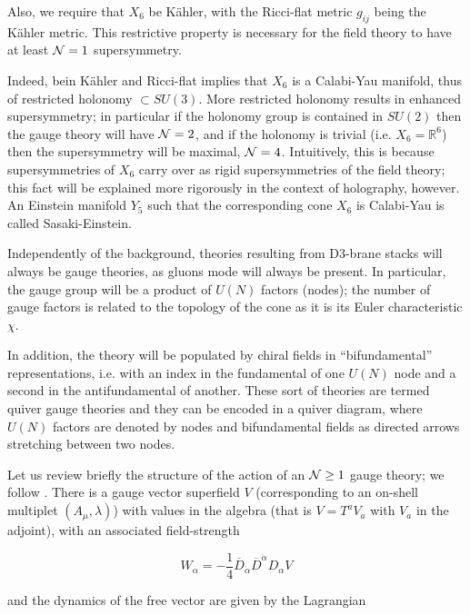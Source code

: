 Also, we require that $X_6$ be K\"ahler, with the Ricci-flat metric $g_{ij}$ being the K\"ahler metric. This restrictive property is necessary\cite{KW_SCFT} for the field theory to have at least $\mathcal{N} = 1$ supersymmetry.

Indeed, bein K\"ahler and Ricci-flat implies that $X_6$ is a Calabi-Yau manifold, thus of restricted holonomy $\subset SU(3)$. More restricted holonomy results in enhanced supersymmetry; in particular if the holonomy group is contained in $SU(2)$ then the gauge theory will have $\mathcal{N} = 2$, and if the holonomy is trivial (i.e. $X_6 = \mathbb{R}^6$) then the supersymmetry will be maximal, $\mathcal{N} = 4$. Intuitively, this is because supersymmetries of $X_6$ carry over as rigid supersymmetries of the field theory; this fact will be explained more rigorously in the context of holography, however. An Einstein manifold $Y_5$ such that the corresponding cone $X_6$ is Calabi-Yau is called Sasaki-Einstein.

Independently of the background, theories resulting from D3-brane stacks will always be gauge theories, as gluons mode will always be present. In particular, the gauge group will be a product of $U(N)$ factors (nodes); the number of gauge factors is related to the topology of the cone as it is its Euler characteristic $\chi$.

In addition, the theory will be populated by chiral fields in ``bifundamental'' representations, i.e. with an index in the fundamental of one $U(N)$ node and a second in the antifundamental of another. These sort of theories are termed quiver gauge theories and they can be encoded in a quiver diagram, where $U(N)$ factors are denoted by nodes and bifundamental fields as directed arrows stretching between two nodes.


Let us review briefly the structure of the action of an $\mathcal{N} \geq 1$ gauge theory; we follow \cite{wessbagger}. There is a gauge vector superfield $V$ (corresponding to an on-shell multiplet $(A_\mu,\lambda)$) with values in the algebra (that is $V = T^a V_a$ with $V_a$ in the adjoint), with an associated field-strength

\begin{equation}
	W_\alpha = - \frac{1}{4} \overline{D}_{\dot \alpha} \overline{D}^{\dot \alpha} D_\alpha V
	\label{}
\end{equation}

and the dynamics of the free vector are given by the Lagrangian

